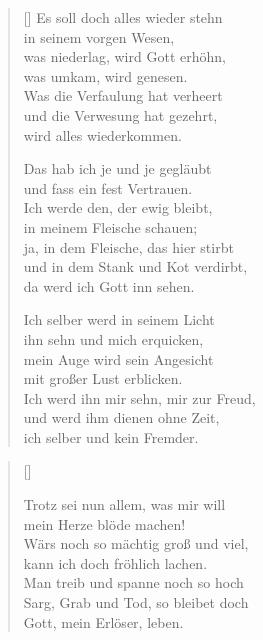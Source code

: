 \begin{multicols}{2}
\begin{verse}[\versewidth]
 Es soll doch alles wieder stehn\\
in seinem vorgen Wesen,\\
was niederlag, wird Gott erhöhn,\\
was umkam, wird genesen.\\
Was die Verfaulung hat verheert\\
und die Verwesung hat gezehrt,\\
wird alles wiederkommen.

 Das hab ich je und je gegläubt\\
und fass ein fest Vertrauen.\\
Ich werde den, der ewig bleibt,\\
in meinem Fleische schauen;\\
ja, in dem Fleische, das hier stirbt\\
und in dem Stank und Kot verdirbt,\\
da werd ich Gott inn sehen.

 Ich selber werd in seinem Licht\\
ihn sehn und mich erquicken,\\
mein Auge wird sein Angesicht\\
mit großer Lust erblicken.\\
Ich werd ihn mir sehn, mir zur Freud,\\
und werd ihm dienen ohne Zeit,\\
ich selber und kein Fremder.

\end{verse}
\end{multicols}

\begin{center}
\settowidth{\versewidth}{Der, vor dem die Welt erschrickt,}
\begin{verse}[\versewidth]


 Trotz sei nun allem, was mir will\\
mein Herze blöde machen!\\
Wärs noch so mächtig groß und viel,\\
kann ich doch fröhlich lachen.\\
Man treib und spanne noch so hoch\\
Sarg, Grab und Tod, so bleibet doch\\
Gott, mein Erlöser, leben.

\end{verse}
\end{center}
